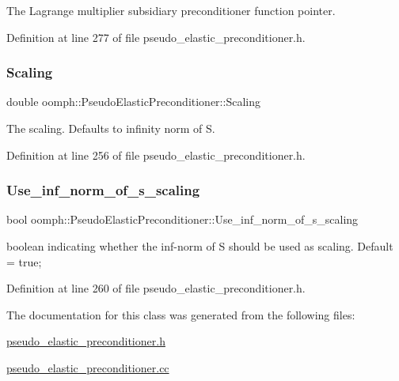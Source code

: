 The Lagrange multiplier subsidiary preconditioner function pointer. 



Definition at line 277 of file pseudo\+\_\+elastic\+\_\+preconditioner.\+h.

\mbox{\label{classoomph_1_1PseudoElasticPreconditioner_a3e2302245fa432f49e3f979cbfe6b3a2}} 
\subsubsection{\texorpdfstring{Scaling}{Scaling}}
{\footnotesize\ttfamily double oomph\+::\+Pseudo\+Elastic\+Preconditioner\+::\+Scaling\hspace{0.3cm}{\ttfamily [private]}}



The scaling. Defaults to infinity norm of S. 



Definition at line 256 of file pseudo\+\_\+elastic\+\_\+preconditioner.\+h.

\mbox{\label{classoomph_1_1PseudoElasticPreconditioner_a3ca651eb7983c61cdaea734b19f2ac25}} 
\subsubsection{\texorpdfstring{Use\+\_\+inf\+\_\+norm\+\_\+of\+\_\+s\+\_\+scaling}{Use\_inf\_norm\_of\_s\_scaling}}
{\footnotesize\ttfamily bool oomph\+::\+Pseudo\+Elastic\+Preconditioner\+::\+Use\+\_\+inf\+\_\+norm\+\_\+of\+\_\+s\+\_\+scaling\hspace{0.3cm}{\ttfamily [private]}}



boolean indicating whether the inf-\/norm of S should be used as scaling. Default = true; 



Definition at line 260 of file pseudo\+\_\+elastic\+\_\+preconditioner.\+h.



The documentation for this class was generated from the following files\+:\begin{DoxyCompactItemize}
\item 
\hyperlink{pseudo__elastic__preconditioner_8h}{pseudo\+\_\+elastic\+\_\+preconditioner.\+h}\item 
\hyperlink{pseudo__elastic__preconditioner_8cc}{pseudo\+\_\+elastic\+\_\+preconditioner.\+cc}\end{DoxyCompactItemize}
